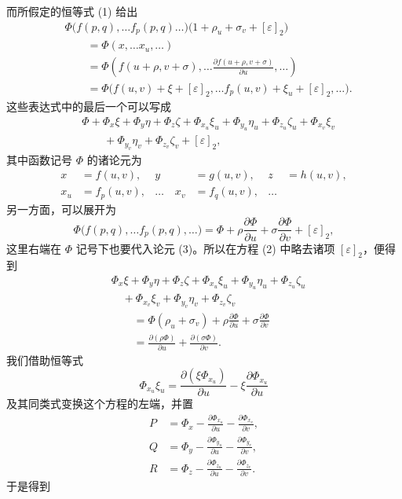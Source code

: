 \documentclass[11pt,a4paper,leqno]{article}
\begin{document}
而所假定的恒等式 (1) 给出
\begin{equation}\tag{2}
\begin{aligned}
&\Phi\bigl(f(p,q),\ldots f_p(p,q)\ldots\bigr)
\bigl(1+\rho_u+\sigma_v+[\varepsilon]_2\bigr)\\
&\qquad=\Phi(x,\ldots x_u,\ldots)\\
&\qquad=\Phi\left(
f(u+\rho,v+\sigma),\ldots
\frac{\partial f(u+\rho,v+\sigma)}{\partial u},\ldots
\right)\\
&\qquad=\Phi\bigl(
f(u,v)+\xi+[\varepsilon]_2,\ldots
f_p(u,v)+\xi_u+[\varepsilon]_2,\ldots
\bigr).
\end{aligned}
\end{equation}
这些表达式中的最后一个可以写成
\[
\begin{aligned}
&\Phi+\Phi_x\xi+\Phi_y\eta+\Phi_z\zeta
+\Phi_{x_u}\xi_u+\Phi_{y_u}\eta_u+\Phi_{z_u}\zeta_u
+\Phi_{x_v}\xi_v\\
&\qquad+\Phi_{y_v}\eta_v+\Phi_{z_v}\zeta_v+[\varepsilon]_2,
\end{aligned}
\]
其中函数记号 $\Phi$ 的诸论元为
\begin{equation}\tag{3}
\begin{aligned}
x&=f(u,v),&y&=g(u,v),&z&=h(u,v),\\
x_u&=f_p(u,v),&\ldots\quad x_v&=f_q(u,v),&\ldots
\end{aligned}
\end{equation}
另一方面，可以展开为
\[
\Phi\bigl(f(p,q),\ldots f_p(p,q),\ldots\bigr)
=\Phi+\rho\frac{\partial\Phi}{\partial u}
+\sigma\frac{\partial\Phi}{\partial v}+[\varepsilon]_2,
\]
这里右端在 $\Phi$ 记号下也要代入论元 (3)。所以在方程 (2) 中略去诸项
$[\varepsilon]_2$，便得到
\[
\begin{aligned}
&\Phi_x\xi+\Phi_y\eta+\Phi_z\zeta
+\Phi_{x_u}\xi_u+\Phi_{y_u}\eta_u+\Phi_{z_u}\zeta_u\\
&\quad+\Phi_{x_v}\xi_v+\Phi_{y_v}\eta_v+\Phi_{z_v}\zeta_v\\
&\qquad=\Phi(\rho_u+\sigma_v)
+\rho\frac{\partial\Phi}{\partial u}
+\sigma\frac{\partial\Phi}{\partial v}\\
&\qquad=\frac{\partial(\rho\Phi)}{\partial u}
+\frac{\partial(\sigma\Phi)}{\partial v}.
\end{aligned}
\]
我们借助恒等式
\[
\Phi_{x_u}\xi_u
=\frac{\partial(\xi\Phi_{x_u})}{\partial u}
-\xi\frac{\partial\Phi_{x_u}}{\partial u}
\]
及其同类式变换这个方程的左端，并置
\[
\begin{aligned}
P&=\Phi_x-\frac{\partial\Phi_{x_u}}{\partial u}
-\frac{\partial\Phi_{x_v}}{\partial v},\\
Q&=\Phi_y-\frac{\partial\Phi_{y_u}}{\partial u}
-\frac{\partial\Phi_{y_v}}{\partial v},\\
R&=\Phi_z-\frac{\partial\Phi_{z_u}}{\partial u}
-\frac{\partial\Phi_{z_v}}{\partial v}.
\end{aligned}
\]
于是得到
\end{document}
